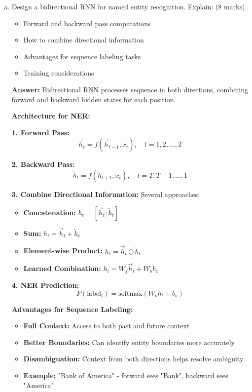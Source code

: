 \documentclass[12pt]{article}
\newcommand{\answer}[1]{{\color{answercolor}\textbf{Answer:} #1}}
\newcommand{\explanation}[1]{{\color{explanationcolor}#1}}
\begin{document}
\begin{enumerate}[(a)]
    \item Design a bidirectional RNN for named entity recognition. Explain: \hfill (8 marks)
    \begin{itemize}
        \item Forward and backward pass computations
        \item How to combine directional information
        \item Advantages for sequence labeling tasks
        \item Training considerations
    \end{itemize}
    
    \answer{Bidirectional RNN processes sequence in both directions, combining forward and backward hidden states for each position.}
    
    \explanation{
    \textbf{Architecture for NER:}
    
    \textbf{1. Forward Pass:}
    $$\overrightarrow{h}_t = f(\overrightarrow{h}_{t-1}, x_t), \quad t = 1, 2, \ldots, T$$
    
    \textbf{2. Backward Pass:}
    $$\overleftarrow{h}_t = f(\overleftarrow{h}_{t+1}, x_t), \quad t = T, T-1, \ldots, 1$$
    
    \textbf{3. Combine Directional Information:}
    Several approaches:
    \begin{itemize}
        \item \textbf{Concatenation:} $h_t = [\overrightarrow{h}_t; \overleftarrow{h}_t]$
        \item \textbf{Sum:} $h_t = \overrightarrow{h}_t + \overleftarrow{h}_t$
        \item \textbf{Element-wise Product:} $h_t = \overrightarrow{h}_t \odot \overleftarrow{h}_t$
        \item \textbf{Learned Combination:} $h_t = W_f \overrightarrow{h}_t + W_b \overleftarrow{h}_t$
    \end{itemize}
    
    \textbf{4. NER Prediction:}
    $$P(\text{label}_t) = \text{softmax}(W_o h_t + b_o)$$
    
    \textbf{Advantages for Sequence Labeling:}
    \begin{itemize}
        \item \textbf{Full Context:} Access to both past and future context
        \item \textbf{Better Boundaries:} Can identify entity boundaries more accurately
        \item \textbf{Disambiguation:} Context from both directions helps resolve ambiguity
        \item \textbf{Example:} "Bank of America" - forward sees "Bank", backward sees "America"
    \end{itemize}
    
}
\end{enumerate}
\end{document}
